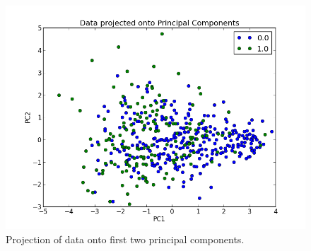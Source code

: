 \begin{figure}[H]
\includegraphics[scale=0.75]{pictures/projectedToPCA.png}
\caption{Projection of data onto first two principal components.}
\label{PCAProjected}
\end{figure}